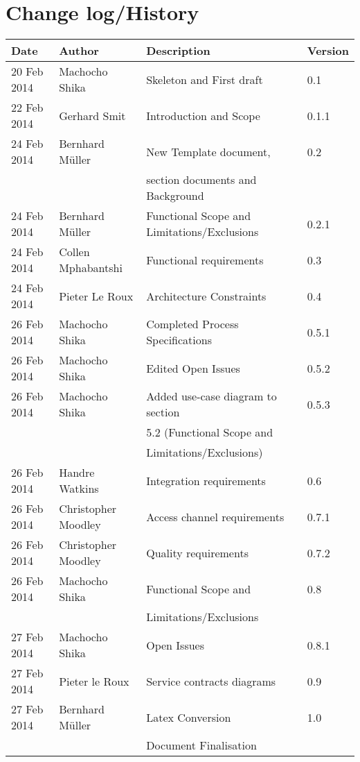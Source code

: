 \documentclass[12pt, a4paper]{scrartcl}
\begin{document}
		\section*{Change log/History}
		\begin{tabular}{| l | l | l | l |}
			\hline
				Date & Author & Description & Version \\
			\hline
				20 Feb 2014 & Machocho Shika & Skeleton and First draft & 0.1 \\
			\hline
				22 Feb 2014 & Gerhard Smit & Introduction and Scope & 0.1.1\\
			\hline
				24 Feb 2014 & Bernhard M\"uller & New Template document, & 0.2\\ 
				\phantom & \phantom & section documents and Background & \\
			\hline
				24 Feb 2014 & Bernhard M\"uller & Functional Scope and Limitations/Exclusions	& 0.2.1\\
			\hline
				24 Feb 2014 & Collen Mphabantshi & Functional requirements & 0.3\\
			\hline
				24 Feb 2014 & Pieter Le Roux & Architecture Constraints & 0.4\\
			\hline
				26 Feb 2014 & Machocho Shika & Completed Process Specifications & 0.5.1\\
			\hline
				26 Feb 2014 & Machocho Shika & Edited Open Issues & 0.5.2\\
			\hline
				26 Feb 2014 & Machocho Shika & Added use-case diagram to section & 0.5.3 \\
				\phantom & \phantom & 5.2 (Functional Scope and &   \\
				\phantom & \phantom & Limitations/Exclusions) & \\
			\hline
				26 Feb 2014 & Handre Watkins & Integration requirements & 0.6\\
			\hline
				26 Feb 2014 & Christopher Moodley & Access channel requirements & 0.7.1\\
			\hline
				26 Feb 2014 & Christopher Moodley & Quality requirements & 0.7.2\\
			\hline
				26 Feb 2014 & Machocho Shika & Functional Scope and & 0.8\\
				\phantom & \phantom & Limitations/Exclusions & \\
			\hline
				27 Feb 2014 & Machocho Shika & Open Issues & 0.8.1\\
			\hline
				27 Feb 2014 & Pieter le Roux & Service contracts diagrams & 0.9\\
			\hline
				27 Feb 2014 & Bernhard M\"uller & Latex Conversion & 1.0\\
				\phantom &\phantom & Document Finalisation & \\
			\hline
		\end{tabular}
		\newpage
\end{document}
